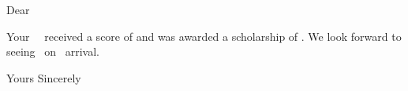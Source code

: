\documentclass[12pt]{letter}
\begin{document}
\begin{DTLenvmapdata}
\begin{letter}{}
 \opening{Dear } 

Your \personchild\ \personfullname\ received a score of
   and was awarded a scholarship of
  . We look forward to seeing
  \them\ on \their\ arrival. 

\closing{Yours Sincerely}
 \end{letter}
\end{DTLenvmapdata} 
\end{document}
